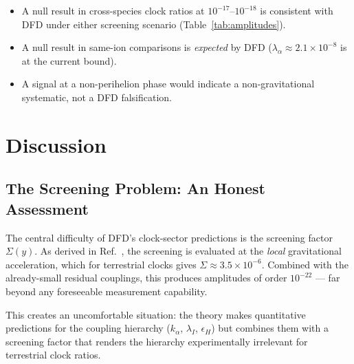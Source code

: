 \documentclass[twocolumn,showpacs,preprintnumbers,amsmath,amssymb,prd]{revtex4-2}
\newcommand{\kalpha}{k_\alpha}
\begin{document}
\begin{itemize}
\item A null result in cross-species clock ratios at
  $10^{-17}$--$10^{-18}$ is consistent with DFD under either
  screening scenario (Table~\ref{tab:amplitudes}).

\item A null result in same-ion comparisons is \emph{expected}
  by DFD ($\lambda_\alpha \approx 2.1 \times 10^{-8}$ is at
  the current bound).

\item A signal at a non-perihelion phase would indicate a
  non-gravitational systematic, not a DFD falsification.
\end{itemize}

\section{Discussion}\label{sec:discussion}

\subsection{The Screening Problem: An Honest Assessment}

The central difficulty of DFD's clock-sector predictions is the
screening factor $\Sigma(y)$.  As derived in
Ref.~\cite{Alcock2025_DFD_v32}, the screening is evaluated at the
\emph{local} gravitational acceleration, which for terrestrial
clocks gives $\Sigma \approx 3.5 \times 10^{-6}$.  Combined with
the already-small residual couplings, this produces amplitudes of
order $10^{-22}$ --- far beyond any foreseeable measurement
capability.

This creates an uncomfortable situation: the theory makes
quantitative predictions for the coupling hierarchy ($\kalpha$,
$\lambda_I$, $\epsilon_H$) but combines them with a screening
factor that renders the hierarchy experimentally irrelevant for
terrestrial clock ratios.
\end{document}
